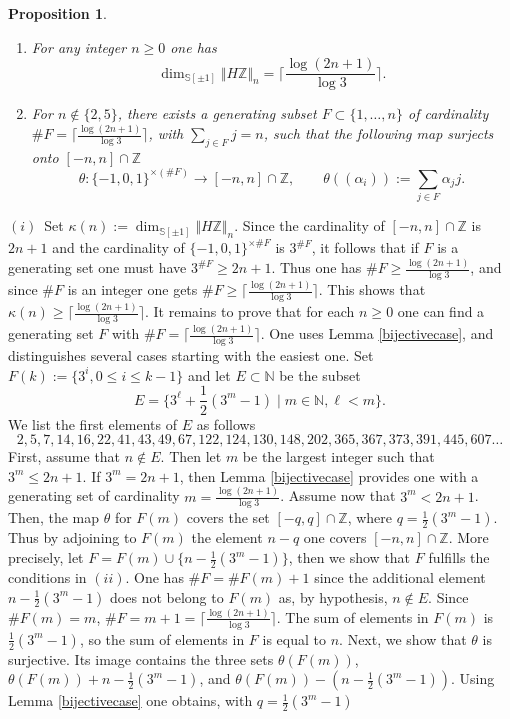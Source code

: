 \documentclass[cupthm]{CUP-JNL-JMJ}
\numberwithin{equation}{section}
\theoremstyle{cupplain}
\newtheorem{proposition}[theorem]{Proposition}
\theoremstyle{cupdefinition}
\theoremstyle{cupremark}
\theoremstyle{cupproof}
\def\N{{\mathbb N}}
\def\S{{\mathbb S}}
\def\Z{{\mathbb Z}}
\def\sss{{\S}}
\def\spm{{\sss[\pm 1]}}
\begin{document}
\begin{proposition}\label{dimhzn}
\begin{enumerate}
\item[(i)] For any integer $n \geq 0$ one has 
\begin{equation}\label{dimhzn1}
\dim_{\spm}\Vert H\Z\Vert_n=\bigg\lceil \frac{\log(2n+1)}{\log 3}\bigg\rceil.
\end{equation}
\item[(ii)] For $n\notin \{2,5\}$, there exists a generating subset $F\subset \{1,\ldots,n\}$ of cardinality $\#F=\lceil \frac{\log(2n+1)}{\log 3}\rceil$, with $\sum_{j\in F} j=n$, such that the following map surjects onto $[-n,n]\cap \Z$
\[
	\theta:\{-1,0,1\}^{\times(\#F)}\to [-n,n]\cap \Z, \qquad \theta((\alpha_i)):=\sum_{j\in F} \alpha_j j.
\]
		\end{enumerate}
\end{proposition}
\proof $(i)$~Set $\kappa(n):=\dim_{\spm}\Vert H\Z\Vert_n$. Since the cardinality of $[-n,n]\cap \Z$ is $2n+1$ and the cardinality of $\{-1,0,1\}^{\times\#F}$ is $3^{\#F}$, it follows that if $F$ is a generating set one must have $3^{\#F}\geq 2n+1$. Thus one has $\#F\geq \frac{\log(2n+1)}{\log 3} $, and since $\#F$ is an integer one gets $\#F\geq \lceil \frac{\log(2n+1)}{\log 3}\rceil $. This shows that $\kappa(n)\geq \lceil \frac{\log(2n+1)}{\log 3}\rceil $. It remains to prove that for each $n\ge 0$ one can find a generating set $F$ with $\# F=\lceil \frac{\log(2n+1)}{\log 3}\rceil $. One uses Lemma \ref{bijectivecase}, and distinguishes several cases starting with the easiest one. Set $F(k):=\{3^i,0\leq i\leq k-1\}$ and let $E\subset \N$ be the subset
\begin{equation}\label{exceptionale}
	E=\bigg\{3^\ell+\frac{1}{2} \left(3^m-1\right)\mid m\in \N, \ell<m \bigg\}.
\end{equation}
We list the first elements of $E$ as follows
\[
2,5,7,14,16,22,41,43,49,67,122,124,130,148,202,365,367,373,391,445,607\ldots
\]
 First, assume  that $n\notin E$. Then let $m$ be the largest integer such that $3^m\leq 2n+1$. If  $3^m= 2n+1$, then  Lemma \ref{bijectivecase} provides one with 
a generating set of cardinality $m=\frac{\log(2n+1)}{\log 3}$. Assume now that $3^m< 2n+1$. Then,  the map $\theta$ for $F(m)$  covers the set $[-q,q]\cap \Z$, where $q=\frac{1}{2} \left(3^m-1\right)$. Thus by adjoining to $F(m)$  the element $n-q$ one  covers $[-n,n]\cap \Z$. More precisely,  let 
$F=F(m)\cup \{n-\frac{1}{2} \left(3^m-1\right)\}$, then we show that $F$ fulfills the conditions in $(ii)$. One has $\# F = \# F(m)+1$ since the additional element $n-\frac{1}{2} \left(3^m-1\right)$ does not belong to $F(m)$ as, by hypothesis, $n\notin E$. Since $\# F(m)=m$, $\#F=m+1=\lceil \frac{\log(2n+1)}{\log 3}\rceil$. The sum of elements in $F(m)$ is $\frac{1}{2} \left(3^m-1\right)$, so the sum of elements in $F$ is equal to $n$. Next, we show that  $\theta$ is surjective. Its image contains the three sets $\theta(F(m))$, $\theta(F(m))+n-\frac{1}{2} \left(3^m-1\right)$, and $\theta(F(m))-(n-\frac{1}{2} \left(3^m-1\right))$.  Using Lemma \ref{bijectivecase} one obtains, with $q=\frac{1}{2} \left(3^m-1\right)$
\end{document}
